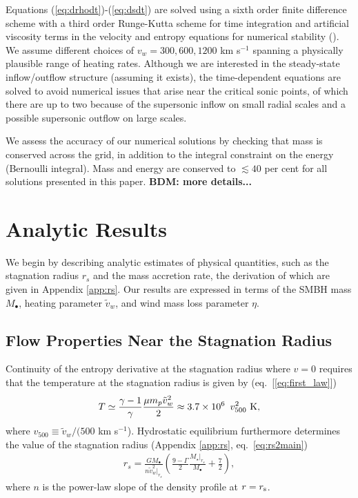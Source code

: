 \documentclass[usenatbib,fleqn]{mn2e}
\newcommand{\rs}{r_s}
\newcommand{\vw}{\tilde{v}_{w}}
\newcommand{\Mbh}[1][]{M_{\bullet#1}}
\begin{document}
Equations (\ref{eq:drhodt})-(\ref{eq:dsdt}) are solved using a sixth
order finite difference scheme with a third order Runge-Kutta scheme
for time integration and artificial viscosity terms in the velocity
and entropy equations for numerical stability
(\citealt{Brandenburg:2003a}).  We assume different
choices of $v_{w} = 300, 600, 1200$ km s$^{-1}$ spanning a
physically plausible range of heating rates.  Although we are interested in the
steady-state inflow/outflow structure (assuming it exists), the time-dependent equations are solved to avoid numerical issues that arise near the critical sonic points, of which there are up to two because of the supersonic
inflow on small radial scales and a possible supersonic outflow on large scales.

We assess the accuracy of our numerical solutions by checking that mass is conserved across the grid, in addition to the integral constraint on the energy (Bernoulli integral).  Mass and energy are conserved to $\lesssim
40$ per cent for all solutions presented in this paper.  {\bf BDM:
  more details...}


\section{Analytic Results}
\label{sec:results}

We begin by describing analytic estimates of physical quantities, such as the stagnation radius $\rs$ and the mass accretion rate, the derivation of which are given in Appendix \ref{app:rs}.  Our results are expressed in terms of the SMBH mass $M_{\bullet}$, heating parameter $\tilde{v}_{w}$, and wind mass loss parameter $\eta$.

\subsection{Flow Properties Near the Stagnation Radius}

Continuity of the entropy derivative at the stagnation radius where $v = 0$ requires that the temperature at the stagnation radius is given by (eq.~[\ref{eq:first_law}])
\begin{align}
T \simeq \frac{\gamma-1}{\gamma}\frac{\mu m_p \tilde{v}_{w}^{2}}{2} \approx 3.7
\times 10^6\ \, v_{500}^2 \,\,{\rm K},
\label{eq:Tanalytic}
\end{align}
where $v_{500} \equiv \tilde{v}_{w}/(500$ km s$^{-1}$).  Hydrostatic equilibrium furthermore determines the value of the stagnation radius (Appendix \ref{app:rs}, eq.~\ref{eq:rs2main})
\begin{align}
\rs=\frac{G \Mbh}{n \vw^{2}|_{\rs}}\left(\frac{9-\Gamma}{2} \frac{M_{\star}|_{\rs}}{\Mbh} +\frac{7}{2}\right),
\label{eq:stag_analytic}
\end{align}
where $n$ is the power-law slope of the density profile at $r = r_{\rm s}$.  
\end{document}
